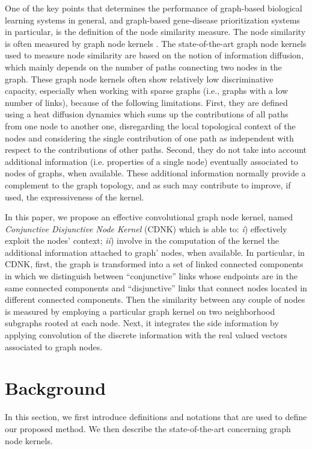\documentclass[review]{elsarticle}
\begin{document}
One of the key points that determines the performance of graph-based biological learning systems in general, and graph-based gene-disease  prioritization systems in particular, is the definition of the node similarity measure. The node similarity is often measured by graph node kernels \cite{kondor2002diffusion,chen2014disease,fouss2006experimental,chebotarev2006matrix}. The state-of-the-art graph node kernels used to measure node similarity are based on the notion of information diffusion, which mainly depends on the number of paths connecting two nodes in the graph. These graph node kernels often show relatively low discriminative capacity, especially when working with sparse graphs (i.e., graphs with a  low number of  links), because of the following limitations. First, they are defined using a heat diffusion dynamics which sums up the contributions of all  paths from one node to another one, disregarding the local topological context of the nodes and considering the single contribution of one path as independent with respect to the contributions of other paths.
Second, they do not take into account additional information (i.e. properties of a single node) eventually associated to nodes of graphs, when available. These additional information normally provide a complement to the graph topology, and as such may contribute to improve, if used, the expressiveness of the kernel. 

In this paper, we propose an effective convolutional graph node kernel, named \textit{Conjunctive Disjunctive Node Kernel} (CDNK) which is able to: \textit{i}) effectively exploit the nodes' context; \textit{ii}) involve in the computation of the kernel the additional information attached to graph' nodes, when available.
In particular, in CDNK, first, the graph is transformed into a set of linked
connected components in which we distinguish between “conjunctive” links
whose endpoints are in the same connected components and “disjunctive”
links that connect nodes located in different connected components. Then
the similarity between any couple of nodes is measured by employing a
particular graph kernel on two neighborhood subgraphs rooted at each
node. Next, it integrates the side information by applying convolution
of the discrete information with the real valued vectors associated to
graph nodes. 

\section{Background}
In this section, we first introduce definitions and notations that are used to define our proposed method. We then describe the state-of-the-art concerning graph node kernels.
\end{document}
